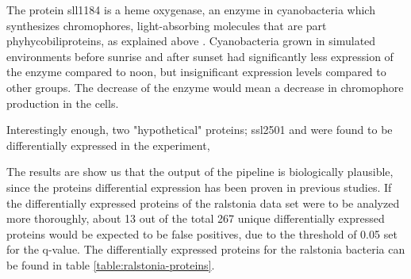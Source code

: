 The protein sll1184 is a heme oxygenase, an enzyme in cyanobacteria which synthesizes chromophores, light-absorbing molecules that are part phyhycobiliproteins, as explained above \cite{heme-oxygenase} \cite{heme-oxygenase-2}. Cyanobacteria grown in simulated environments before sunrise and after sunset had significantly less expression of the enzyme compared to noon, but insignificant expression levels compared to other groups. The decrease of the enzyme would mean a decrease in chromophore production in the cells.

Interestingly enough, two "hypothetical" proteins; ssl2501 and  were found to be differentially expressed in the experiment, 

The results are show us that the output of the pipeline is biologically plausible, since the proteins differential expression has been proven in previous studies. If the differentially expressed proteins of the ralstonia data set were to be analyzed more thoroughly, about 13 out of the total 267 unique  differentially expressed proteins would be expected to be false positives, due to the threshold of 0.05 set for the q-value. The differentially expressed proteins for the ralstonia bacteria can be found in table \ref{table:ralstonia-proteins}.
